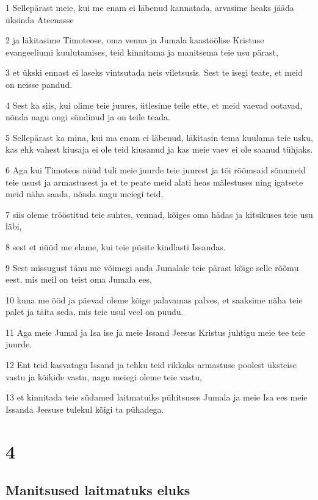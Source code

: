 \par 1 Sellepärast meie, kui me enam ei läbenud kannatada, arvasime heaks jääda üksinda Ateenasse
\par 2 ja läkitasime Timoteose, oma venna ja Jumala kaastöölise Kristuse evangeeliumi kuulutamises, teid kinnitama ja manitsema teie usu pärast,
\par 3 et ükski ennast ei laseks vintsutada neis viletsusis. Sest te isegi teate, et meid on neisse pandud.
\par 4 Sest ka siis, kui olime teie juures, ütlesime teile ette, et meid vaevad ootavad, nõnda nagu ongi sündinud ja on teile teada.
\par 5 Sellepärast ka mina, kui ma enam ei läbenud, läkitasin tema kuulama teie usku, kas ehk vahest kiusaja ei ole teid kiusanud ja kas meie vaev ei ole saanud tühjaks.
\par 6 Aga kui Timoteos nüüd tuli meie juurde teie juurest ja tõi rõõmsaid sõnumeid teie usust ja armastusest ja et te peate meid alati heas mälestuses ning igatsete meid näha saada, nõnda nagu meiegi teid,
\par 7 siis oleme trööstitud teie suhtes, vennad, kõiges oma hädas ja kitsikuses teie usu läbi,
\par 8 sest et nüüd me elame, kui teie püsite kindlasti Issandas.
\par 9 Sest missugust tänu me võimegi anda Jumalale teie pärast kõige selle rõõmu eest, mis meil on teist oma Jumala ees,
\par 10 kuna me ööd ja päevad oleme kõige palavamas palves, et saaksime näha teie palet ja täita seda, mis teie usul veel on puudu.
\par 11 Aga meie Jumal ja Isa ise ja meie Issand Jeesus Kristus juhtigu meie tee teie juurde.
\par 12 Ent teid kasvatagu Issand ja tehku teid rikkaks armastuse poolest üksteise vastu ja kõikide vastu, nagu meiegi oleme teie vastu,
\par 13 et kinnitada teie südamed laitmatuiks pühitsuses Jumala ja meie Isa ees meie Issanda Jeesuse tulekul kõigi ta pühadega.


\chapter{4}

\section*{Manitsused laitmatuks eluks}

